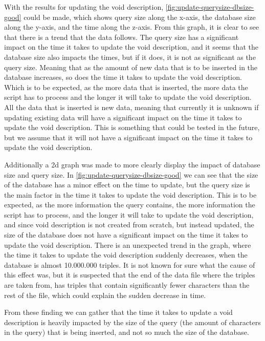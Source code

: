 With the results for updating the \gls{void} description, \autoref{fig:update-querysize-dbsize-good} could be made, which shows query size along the x-axis, the database size along the y-axis, and the time along the z-axis. From this graph, it is clear to see that there is a trend that the data follows. The query size has a significant impact on the time it takes to update the \gls{void} description, and it seems that the database size also impacts the times, but if it does, it is not as significant as the query size. Meaning that as the amount of new data that is to be inserted in the database increases, so does the time it takes to update the \gls{void} description. Which is to be expected, as the more data that is inserted, the more data the script has to process and the longer it will take to update the \gls{void} description. All the data that is inserted is new data, meaning that currently it is unknown if updating existing data will have a significant impact on the time it takes to update the \gls{void} description. This is something that could be tested in the future, but we assume that it will not have a significant impact on the time it takes to update the \gls{void} description.

Additionally a 2d graph was made to more clearly display the impact of database size and query size. In \autoref{fig:update-querysize-dbsize-good} we can see that the size of the database has a minor effect on the time to update, but the query size is the main factor in the time it takes to update the \gls{void} description. This is to be expected, as the more information the query contains, the more information the script has to process, and the longer it will take to update the \gls{void} description, and since \gls{void} description is not created from scratch, but instead updated, the size of the database does not have a significant impact on the time it takes to update the \gls{void} description. There is an unexpected trend in the graph, where the time it takes to update the \gls{void} description suddenly decreases, when the database is almost 10.000.000 triples. It is not known for sure what the cause of this effect was, but it is suspected that the end of the data file where the triples are taken from, has triples that contain significantly fewer characters than the rest of the file, which could explain the sudden decrease in time.

From these finding we can gather that the time it takes to update a \gls{void} description is heavily impacted by the size of the query (the amount of characters in the query) that is being inserted, and not so much the size of the database.


